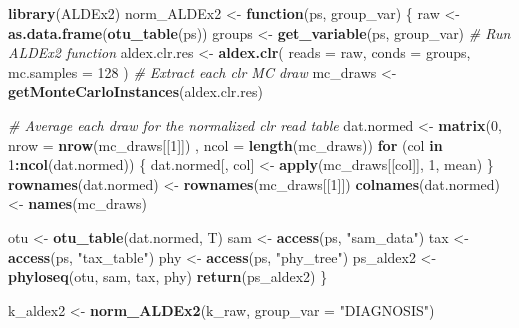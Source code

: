 \documentclass[
]{book}
\newenvironment{Shaded}{\begin{snugshade}}{\end{snugshade}}
\newcommand{\CommentTok}[1]{\textcolor[rgb]{0.56,0.35,0.01}{\textit{#1}}}
\newcommand{\ControlFlowTok}[1]{\textcolor[rgb]{0.13,0.29,0.53}{\textbf{#1}}}
\newcommand{\DataTypeTok}[1]{\textcolor[rgb]{0.13,0.29,0.53}{#1}}
\newcommand{\DecValTok}[1]{\textcolor[rgb]{0.00,0.00,0.81}{#1}}
\newcommand{\KeywordTok}[1]{\textcolor[rgb]{0.13,0.29,0.53}{\textbf{#1}}}
\newcommand{\NormalTok}[1]{#1}
\newcommand{\OperatorTok}[1]{\textcolor[rgb]{0.81,0.36,0.00}{\textbf{#1}}}
\newcommand{\StringTok}[1]{\textcolor[rgb]{0.31,0.60,0.02}{#1}}
\begin{document}
\begin{Shaded}
\begin{Highlighting}[]
\KeywordTok{library}\NormalTok{(ALDEx2)}
\NormalTok{norm\_ALDEx2 \textless{}{-}}\StringTok{ }\ControlFlowTok{function}\NormalTok{(ps, group\_var) \{}
\NormalTok{    raw \textless{}{-}}\StringTok{ }\KeywordTok{as.data.frame}\NormalTok{(}\KeywordTok{otu\_table}\NormalTok{(ps))}
\NormalTok{    groups \textless{}{-}}\StringTok{ }\KeywordTok{get\_variable}\NormalTok{(ps, group\_var)}
    \CommentTok{\# Run ALDEx2 function}
\NormalTok{    aldex.clr.res \textless{}{-}}
\StringTok{        }\KeywordTok{aldex.clr}\NormalTok{(}
            \DataTypeTok{reads =}\NormalTok{ raw,}
            \DataTypeTok{conds =}\NormalTok{ groups,}
            \DataTypeTok{mc.samples =} \DecValTok{128}
\NormalTok{        )}
    \CommentTok{\# Extract each clr MC draw}
\NormalTok{    mc\_draws \textless{}{-}}\StringTok{ }\KeywordTok{getMonteCarloInstances}\NormalTok{(aldex.clr.res)}

    \CommentTok{\# Average each draw for the \textquotesingle{}normalized\textquotesingle{} clr read table}
\NormalTok{    dat.normed \textless{}{-}}
\StringTok{        }\KeywordTok{matrix}\NormalTok{(}\DecValTok{0}\NormalTok{,}
               \DataTypeTok{nrow =} \KeywordTok{nrow}\NormalTok{(mc\_draws[[}\DecValTok{1}\NormalTok{]]) ,}
               \DataTypeTok{ncol =} \KeywordTok{length}\NormalTok{(mc\_draws))}
    \ControlFlowTok{for}\NormalTok{ (col }\ControlFlowTok{in} \DecValTok{1}\OperatorTok{:}\KeywordTok{ncol}\NormalTok{(dat.normed)) \{}
\NormalTok{        dat.normed[, col] \textless{}{-}}\StringTok{ }\KeywordTok{apply}\NormalTok{(mc\_draws[[col]], }\DecValTok{1}\NormalTok{, mean)}
\NormalTok{    \}}
    \KeywordTok{rownames}\NormalTok{(dat.normed) \textless{}{-}}\StringTok{ }\KeywordTok{rownames}\NormalTok{(mc\_draws[[}\DecValTok{1}\NormalTok{]])}
    \KeywordTok{colnames}\NormalTok{(dat.normed) \textless{}{-}}\StringTok{ }\KeywordTok{names}\NormalTok{(mc\_draws)}
    
\NormalTok{    otu \textless{}{-}}\StringTok{ }\KeywordTok{otu\_table}\NormalTok{(dat.normed, T)}
\NormalTok{    sam \textless{}{-}}\StringTok{ }\KeywordTok{access}\NormalTok{(ps, }\StringTok{"sam\_data"}\NormalTok{)}
\NormalTok{    tax \textless{}{-}}\StringTok{ }\KeywordTok{access}\NormalTok{(ps, }\StringTok{"tax\_table"}\NormalTok{)}
\NormalTok{    phy \textless{}{-}}\StringTok{ }\KeywordTok{access}\NormalTok{(ps, }\StringTok{"phy\_tree"}\NormalTok{)}
\NormalTok{    ps\_aldex2 \textless{}{-}}\StringTok{ }\KeywordTok{phyloseq}\NormalTok{(otu, sam, tax, phy)}
    \KeywordTok{return}\NormalTok{(ps\_aldex2)}
\NormalTok{\}}

\NormalTok{k\_aldex2 \textless{}{-}}\StringTok{ }\KeywordTok{norm\_ALDEx2}\NormalTok{(k\_raw, }\DataTypeTok{group\_var =} \StringTok{"DIAGNOSIS"}\NormalTok{)}
\end{Highlighting}
\end{Shaded}
\end{document}
